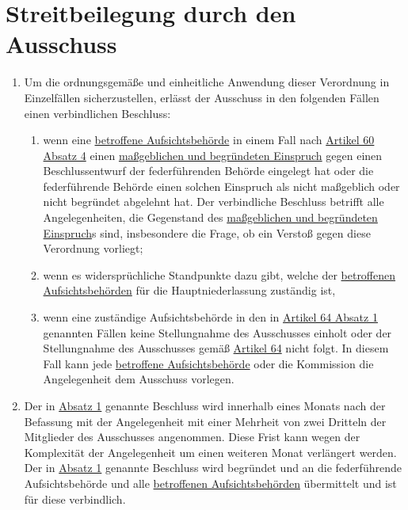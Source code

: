 \chapter{Streitbeilegung durch den Ausschuss}
\label{ch:65}


\begin{enumerate}

  \item Um die ordnungsgemäße und einheitliche Anwendung dieser Verordnung in Einzelfällen sicherzustellen, erlässt der
   Ausschuss in den folgenden Fällen einen verbindlichen Beschluss:
  \label{itm:65-1}

  \begin{enumerate}
  
    \item wenn eine \hyperref[itm:04-22]{betroffene Aufsichtsbehörde} in einem Fall nach \hyperref[itm:60-4]{Artikel 60 Absatz 4} einen
     \hyperref[itm:04-27]{maßgeblichen und begründeten Einspruch} gegen einen Beschlussentwurf der federführenden Behörde eingelegt hat oder
     die federführende Behörde einen solchen Einspruch als nicht maßgeblich oder nicht begründet abgelehnt hat. Der
     verbindliche Beschluss betrifft alle Angelegenheiten, die Gegenstand des \hyperref[itm:04-27]{maßgeblichen und begründeten Einspruch}s
     sind, insbesondere die Frage, ob ein Verstoß gegen diese Verordnung vorliegt;
    \label{itm:65-1a}

    \item wenn es widersprüchliche Standpunkte dazu gibt, welche der \hyperref[itm:04-22]{betroffenen Aufsichtsbehörden} für die
     Hauptniederlassung zuständig ist,
    \label{itm:65-1b}

    \item wenn eine zuständige Aufsichtsbehörde in den in \hyperref[itm:64-1]{Artikel 64 Absatz 1} genannten Fällen
     keine Stellungnahme des Ausschusses einholt oder der Stellungnahme des Ausschusses gemäß \hyperref[ch:64]
     {Artikel 64} nicht folgt. In diesem Fall kann jede \hyperref[itm:04-22]{betroffene Aufsichtsbehörde} oder die Kommission die
     Angelegenheit dem Ausschuss vorlegen.
    \label{itm:65-1c}

  \end{enumerate}

  \item Der in \hyperref[itm:65-1]{Absatz 1} genannte Beschluss wird innerhalb eines Monats nach der Befassung mit der
   Angelegenheit mit einer Mehrheit von zwei Dritteln der Mitglieder des Ausschusses angenommen. Diese Frist kann wegen
   der Komplexität der Angelegenheit um einen weiteren Monat verlängert werden. Der in \hyperref[itm:65-1]{Absatz 1}
   genannte Beschluss wird begründet und an die federführende Aufsichtsbehörde und alle \hyperref[itm:04-22]{betroffenen Aufsichtsbehörden}
   übermittelt und ist für diese verbindlich.
  \label{itm:65-2}


\end{enumerate}
